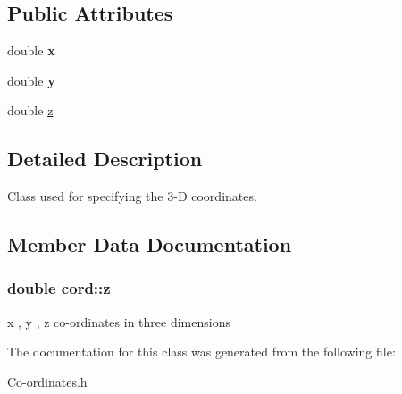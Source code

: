 \subsection*{Public Attributes}
\begin{DoxyCompactItemize}
\item 
\hypertarget{classcord_a6bd1ef6d853a6c1ac453f4a0355e3c41}{double {\bfseries x}}\label{classcord_a6bd1ef6d853a6c1ac453f4a0355e3c41}

\item 
\hypertarget{classcord_a4c894e7247e1d33f161a7051bc4f47f1}{double {\bfseries y}}\label{classcord_a4c894e7247e1d33f161a7051bc4f47f1}

\item 
double \hyperlink{classcord_a119bdda68941228b2d9c354321c8bb7f}{z}
\end{DoxyCompactItemize}


\subsection{Detailed Description}
Class used for specifying the 3-\/\-D coordinates. 

\subsection{Member Data Documentation}
\hypertarget{classcord_a119bdda68941228b2d9c354321c8bb7f}{
\subsubsection[{z}]{\setlength{\rightskip}{0pt plus 5cm}double cord\-::z}}\label{classcord_a119bdda68941228b2d9c354321c8bb7f}
x , y , z co-\/ordinates in three dimensions 

The documentation for this class was generated from the following file\-:\begin{DoxyCompactItemize}
\item 
Co-\/ordinates.\-h\end{DoxyCompactItemize}
